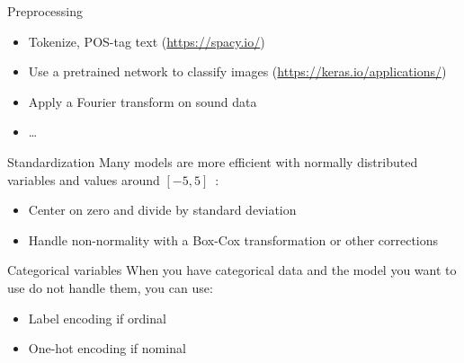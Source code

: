 \begin{frame}{Preprocessing}
  \begin{itemize}[<+->]
  \item Tokenize, POS-tag text (\url{https://spacy.io/})
  \item Use a pretrained network to classify images
    (\url{https://keras.io/applications/})
  \item Apply a Fourier transform on sound data
  \item …
  \end{itemize}

\end{frame}

\begin{frame}{Standardization}
  Many models are more efficient with normally distributed variables and values around $[-5, 5]$ :
  \begin{itemize}
  \item Center on zero and divide by standard deviation
  \item Handle non-normality with a Box-Cox transformation or other corrections
  \end{itemize}
\end{frame}

\begin{frame}{Categorical variables}
  When you have categorical data and the model you want to use do not handle them, you can use:
  \begin{itemize}
  \item Label encoding if ordinal
  \item One-hot encoding if nominal
  \end{itemize}
\end{frame}

